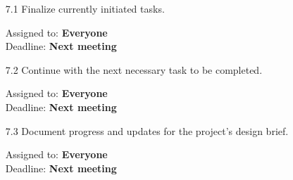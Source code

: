 \documentclass{cce2014-meetings}
\begin{document}
\begin{enumerate}

\item [7.1] Finalize currently initiated tasks.
\begin{flushright}
Assigned to: \textbf{Everyone} \\
Deadline: \textbf{Next meeting}
\end{flushright}

\item [7.2] Continue with the next necessary task to be completed.
\begin{flushright}
Assigned to: \textbf{Everyone} \\
Deadline: \textbf{Next meeting}
\end{flushright}

\item [7.3] Document progress and updates for the project's design brief.
\begin{flushright}
Assigned to: \textbf{Everyone} \\
Deadline: \textbf{Next meeting}
\end{flushright}


\end{enumerate}
\end{document}

